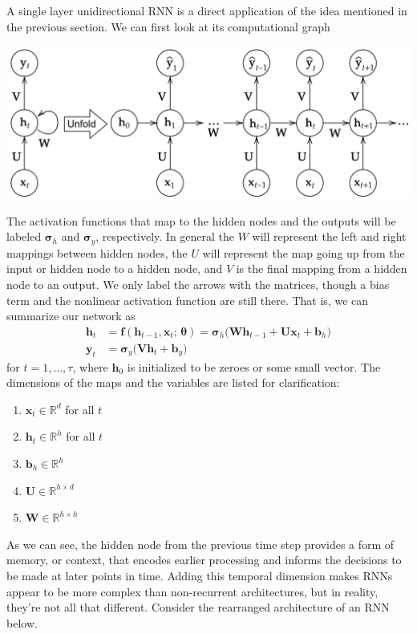 \documentclass{article}
\theoremstyle{definition}
\theoremstyle{remark}
\theoremstyle{definition}
\begin{document}
A single layer unidirectional RNN is a direct application of the idea mentioned in the previous section. We can first look at its computational graph 
\begin{center}
    \includegraphics[scale=0.3]{Images/RNNs/One_Layer_RNN.png}
\end{center}
The activation functions that map to the hidden nodes and the outputs will be labeled $\boldsymbol{\sigma}_{h}$ and $\boldsymbol{\sigma}_{y}$, respectively. In general the $W$ will represent the left and right mappings between hidden nodes, the $U$ will represent the map going up from the input or hidden node to a hidden node, and $V$ is the final mapping from a hidden node to an output. We only label the arrows with the matrices, though a bias term and the nonlinear activation function are still there. That is, we can summarize our network as
\begin{align*}
    \mathbf{h}_t & = \mathbf{f}( \mathbf{h}_{t - 1}, \mathbf{x}_{t} ; \, \boldsymbol{\theta}) = \boldsymbol{\sigma}_h \big( \mathbf{W} \mathbf{h}_{t - 1} + \mathbf{U} \mathbf{x}_t + \mathbf{b}_h \big) \\
    \mathbf{y}_t & = \boldsymbol{\sigma}_y \big( \mathbf{V} \mathbf{h}_t + \mathbf{b}_y \big) 
\end{align*}
for $t = 1, \ldots, \tau$, where $\mathbf{h}_0$ is initialized to be zeroes or some small vector. The dimensions of the maps and the variables are listed for clarification: 
\begin{enumerate}
    \item $\mathbf{x}_t \in \mathbb{R}^d$ for all $t$
    \item $\mathbf{h}_t \in \mathbb{R}^h$ for all $t$
    \item $\mathbf{b}_h \in \mathbb{R}^h$
    \item $\mathbf{U} \in \mathbb{R}^{h \times d}$
    \item $\mathbf{W} \in \mathbb{R}^{h \times h}$
\end{enumerate}
As we can see, the hidden node from the previous time step provides a form of memory, or context, that encodes earlier processing and informs the decisions to be made at later points in time. Adding this temporal dimension makes RNNs appear to be more complex than non-recurrent architectures, but in reality, they’re not all that different. Consider the rearranged architecture of an RNN below. 
\end{document}
